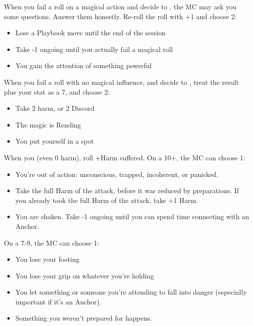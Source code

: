 



\begin{multicols}{3}
  \begin{move}
    When you fail a roll on a magical action and decide to , the MC may ask you some
    questions. Answer them honestly. Re-roll the roll with +1 and choose
    2:
    \begin{itemize}
      \setlength\itemsep{0em}
    \item Lose a Playbook move until the end of the session
    \item Take -1 ongoing until you actually fail a magical roll
    \item You gain the attention of something powerful
    \end{itemize}
  \end{move}

  \SEPARATOR
  
  \begin{move}
    When you fail a roll with no magical influence, and decide to
    , treat the result plus your stat as a
    7, and choose 2:
    \begin{itemize}
      \setlength\itemsep{0em}
    \item Take 2 harm, or 2 Discord
    \item The magic is Rending
    \item You put yourself in a spot
    \end{itemize}
  \end{move}

  \SEPARATOR

  \begin{move}
    When you  (even 0 harm), roll +Harm suffered. On a 10+, the MC can choose 1:
    \begin{itemize}
      \setlength\itemsep{0em}
    \item You're out of action: unconscious, trapped, incoherent, or
      panicked.
    \item Take the full Harm of the attack, before it was reduced by
      preparations. If you already took the full Harm of the attack, take
      +1 Harm.
    \item You are shaken. Take -1 ongoing until you can spend time
      connecting with an Anchor.
    \end{itemize}
    On a 7-9, the MC can choose 1:
    \begin{itemize}
      \setlength\itemsep{0em}
    \item You lose your footing
    \item You lose your grip on whatever you're holding
    \item You let something or someone you're attending to fall into
      danger (especially important if it's an Anchor).
    \item Something you weren't prepared for happens.
    \end{itemize}
    

\end{move}
\end{multicols}
